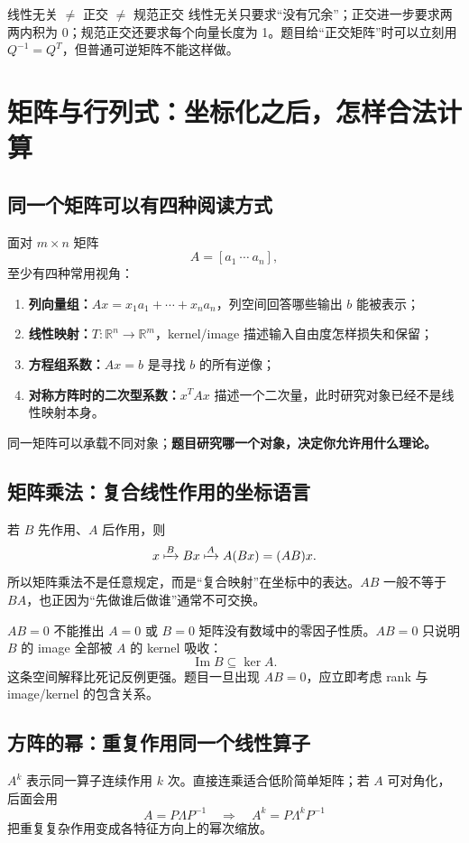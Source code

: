 \documentclass[11pt,a4paper,openany]{ctexbook}
\newcommand{\key}[1]{\textbf{\color{deep}#1}}
\begin{document}
\begin{boundarybox}{线性无关 $\neq$ 正交 $\neq$ 规范正交}
线性无关只要求“没有冗余”；正交进一步要求两两内积为 0；规范正交还要求每个向量长度为 1。题目给“正交矩阵”时可以立刻用 $Q^{-1}=Q^T$，但普通可逆矩阵不能这样做。
\end{boundarybox}

\chapter{矩阵与行列式：坐标化之后，怎样合法计算}

\section{同一个矩阵可以有四种阅读方式}
面对 $m\times n$ 矩阵
\[
A=[a_1\ \cdots\ a_n],
\]
至少有四种常用视角：
\begin{enumerate}
  \item \key{列向量组：}$Ax=x_1a_1+\cdots+x_na_n$，列空间回答哪些输出 $b$ 能被表示；
  \item \key{线性映射：}$T:\mathbb R^n\to\mathbb R^m$，kernel/image 描述输入自由度怎样损失和保留；
  \item \key{方程组系数：}$Ax=b$ 是寻找 $b$ 的所有逆像；
  \item \key{对称方阵时的二次型系数：}$x^TAx$ 描述一个二次量，此时研究对象已经不是线性映射本身。
\end{enumerate}
同一矩阵可以承载不同对象；\key{题目研究哪一个对象，决定你允许用什么理论。}

\section{矩阵乘法：复合线性作用的坐标语言}
若 $B$ 先作用、$A$ 后作用，则
\[
x\xmapsto{B}Bx\xmapsto{A}A(Bx)=(AB)x.
\]
所以矩阵乘法不是任意规定，而是“复合映射”在坐标中的表达。$AB$ 一般不等于 $BA$，也正因为“先做谁后做谁”通常不可交换。

\begin{boundarybox}{$AB=0$ 不能推出 $A=0$ 或 $B=0$}
矩阵没有数域中的零因子性质。$AB=0$ 只说明 $B$ 的 image 全部被 $A$ 的 kernel 吸收：
\[
\operatorname{Im}B\subseteq\ker A.
\]
这条空间解释比死记反例更强。题目一旦出现 $AB=0$，应立即考虑 rank 与 image/kernel 的包含关系。
\end{boundarybox}

\section{方阵的幂：重复作用同一个线性算子}
$A^k$ 表示同一算子连续作用 $k$ 次。直接连乘适合低阶简单矩阵；若 $A$ 可对角化，后面会用
\[
A=P\Lambda P^{-1}\quad\Longrightarrow\quad A^k=P\Lambda^kP^{-1}
\]
把重复复杂作用变成各特征方向上的幂次缩放。
\end{document}
